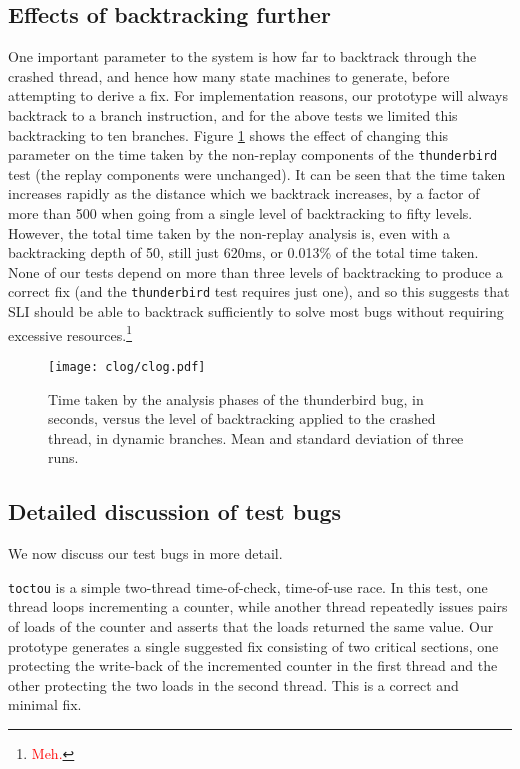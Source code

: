 \documentclass[10pt,twocolumn,preprint,natbib,authoryear]{sigplanconf}
\newcommand{\editorial}[1]{\textcolor{red}{\footnote{\textcolor{red}{#1}}}}
\begin{document}
\subsection{Effects of backtracking further}
\label{sect:eval:backtrack}

One important parameter to the system is how far to backtrack through
the crashed thread, and hence how many state machines to generate,
before attempting to derive a fix.  For implementation reasons, our
prototype will always backtrack to a branch instruction, and for the
above tests we limited this backtracking to ten branches.  Figure
\ref{fig:eval:backtrack} shows the effect of changing this parameter
on the time taken by the non-replay components of the
\verb|thunderbird| test (the replay components were unchanged).  It
can be seen that the time taken increases rapidly as the distance
which we backtrack increases, by a factor of more than 500 when going
from a single level of backtracking to fifty levels.  However, the
total time taken by the non-replay analysis is, even with a
backtracking depth of 50, still just 620ms, or 0.013\% of the total
time taken.  None of our tests depend on more than three levels of
backtracking to produce a correct fix (and the \verb|thunderbird| test
requires just one), and so this suggests that SLI should be able to
backtrack sufficiently to solve most bugs without requiring excessive
resources.\editorial{Meh.}

\begin{figure}
\texttt{[image: clog/clog.pdf]}
\caption{Time taken by the analysis phases of the thunderbird bug, in
  seconds, versus the level of backtracking applied to the crashed
  thread, in dynamic branches.  Mean and standard deviation of three
  runs.}
\label{fig:eval:backtrack}
\end{figure}


\subsection{Detailed discussion of test bugs}
\label{sect:bug_descr}

We now discuss our test bugs in more detail.

\verb|toctou| is a simple two-thread time-of-check, time-of-use race.
In this test, one thread loops incrementing a counter, while another
thread repeatedly issues pairs of loads of the counter and asserts
that the loads returned the same value.  Our prototype generates a
single suggested fix consisting of two critical sections, one
protecting the write-back of the incremented counter in the first
thread and the other protecting the two loads in the second thread.
This is a correct and minimal fix.
\end{document}
